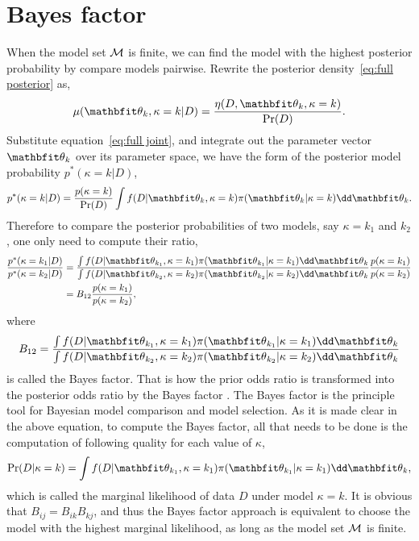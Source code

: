 \section{Bayes factor}
\label{sec:Bayes factor}

When the model set $\mathcal{M}$ is finite, we can find the model with the highest
posterior probability by compare models pairwise. Rewrite the posterior
density~\eqref{eq:full posterior} as,
\begin{equation}
  \mu(\bth_k,\kappa=k|D) = \frac{\eta(D,\bth_k,\kappa=k)}{\Pr(D)}.
\end{equation}
Substitute equation~\eqref{eq:full joint}, and integrate out the parameter
vector $\bth_k$ over its parameter space, we have the form of the posterior
model probability $p^*(\kappa=k|D)$,
\begin{equation}
  p^*(\kappa=k|D) = \frac{p(\kappa = k)}{\Pr(D)}
  \int f(D|\bth_k,\kappa = k)\pi(\bth_k|\kappa = k)\dd\bth_k.
\end{equation}
Therefore to compare the posterior probabilities of two models, say $\kappa =
k_1$ and $k_2$, one only need to compute their ratio,
\begin{align*}
  \frac{p^*(\kappa = k_1|D)}{p^*(\kappa = k_2|D)} &= \frac
  {\int f(D|\bth_{k_1},\kappa=k_1)\pi(\bth_{k_1}|\kappa=k_1)\dd\bth_k}
  {\int f(D|\bth_{k_2},\kappa=k_2)\pi(\bth_{k_2}|\kappa=k_2)\dd\bth_k}
  \frac{p(\kappa=k_1)}{p(\kappa=k_2)} \\
  & = B_{12} \frac{p(\kappa=k_1)}{p(\kappa=k_2)},
  \label{eq:posterior odd}
\end{align*}
where
\begin{equation}
  B_{12} = \frac
  {\int f(D|\bth_{k_1},\kappa=k_1)\pi(\bth_{k_1}|\kappa=k_1)\dd\bth_k}
  {\int f(D|\bth_{k_2},\kappa=k_2)\pi(\bth_{k_2}|\kappa=k_2)\dd\bth_k}
  \label{eq:bayes factor}
\end{equation}
is called the Bayes factor. That is how the prior odds ratio is transformed
into the posterior odds ratio by the Bayes factor \parencite{Kass1995}. The
Bayes factor is the principle tool for Bayesian model comparison and model
selection. As it is made clear in the above equation, to compute the Bayes
factor, all that needs to be done is the computation of following quality for
each value of $\kappa$,
\begin{equation}
  \Pr(D|\kappa = k)
  = \int f(D|\bth_{k_1},\kappa=k_1)\pi(\bth_{k_1}|\kappa=k_1)\dd\bth_k,
  \label{eq:marginal likelihood}
\end{equation}
which is called the marginal likelihood of data $D$ under model $\kappa = k$.
It is obvious that $B_{ij} = B_{ik} B_{kj}$, and thus the Bayes factor
approach is equivalent to choose the model with the highest marginal
likelihood, as long as the model set $\mathcal{M}$ is finite.

